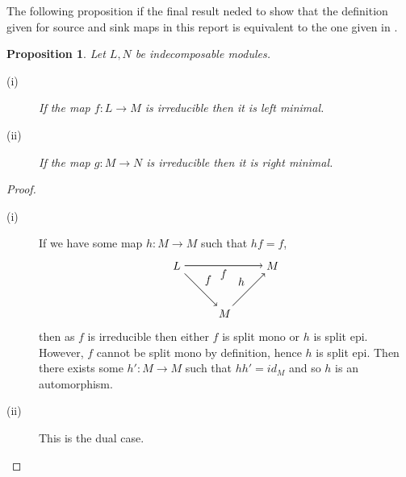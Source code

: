 \documentclass[11.5pt, twoside, a4paper, titlepage]{report}
\theoremstyle{definition}
\theoremstyle{plain}
\newtheorem{prop}[mydef]{Proposition}
\begin{document}
The following proposition if the final result neded to show that the definition given for source and sink maps in this report is equivalent to the one given in \cite{CB3}.
\begin{prop} Let $L,N$ be indecomposable modules.
\begin{description}
\item [(i)] If the map $f: L \to M$ is irreducible then it is left minimal.
\item [(ii)] If the map $g: M \to N$ is irreducible then it is right minimal.
\end{description}
\end{prop}
\begin{proof}
\begin{description}
\item [(i)] If we have some map $h: M \to M$ such that $hf=f$,
\begin{equation*}
\begin{tikzpicture}[->,-latex, auto, main path/.style={->, semithick}, main node/.style={}]
\node	[main node]		(1) at (0,0)		{$L$};
\node [main node]		(2) at (3, 0)		{$M$};
\node [main node]		(3) at (1.5,-1.5)	{$M$};

\draw (1) [main path] edge node [auto, swap] {$f$} (2);
\draw (1) [main path] edge node [auto] {$f$} (3);
\draw (3) [main path] edge node [auto] {$h$} (2);
\end{tikzpicture}
\end{equation*}
then as $f$ is irreducible then either $f$ is split mono or $h$ is split epi. However, $f$ cannot be split mono by definition, hence $h$ is split epi. Then there exists some $h': M \to M$ such that $hh'=id_M$ and so $h$ is an automorphism.
\item [(ii)] This is the dual case.
\end{description}
\end{proof}
\end{document}
